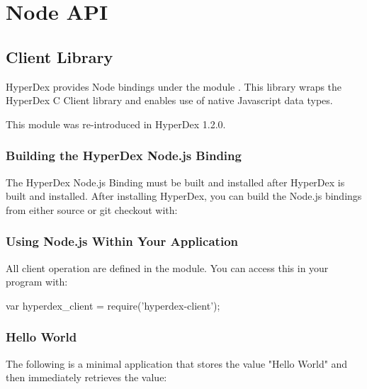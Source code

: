 \chapter{Node API}
\label{chap:api:node}

\section{Client Library}
\label{sec:api:node:client}

HyperDex provides Node bindings under the module .  This
library wraps the HyperDex C Client library and enables use of native Javascript
data types.

This module was re-introduced in HyperDex 1.2.0.

\subsection{Building the HyperDex Node.js Binding}
\label{sec:api:node:building}

The HyperDex Node.js Binding must be built and installed after HyperDex is built
and installed.  After installing HyperDex, you can build the Node.js bindings
from either source or git checkout with:

\begin{consolecode}
\end{consolecode}

\subsection{Using Node.js Within Your Application}
\label{sec:api:node:using}

All client operation are defined in the  module.  You can
access this in your program with:

\begin{javascriptcode}
var hyperdex_client = require('hyperdex-client');
\end{javascriptcode}

\subsection{Hello World}
\label{sec:api:node:hello-world}

The following is a minimal application that stores the value "Hello World" and
then immediately retrieves the value:

\inputminted{javascript}{\topdir/node.js/client/hello-world.js}


